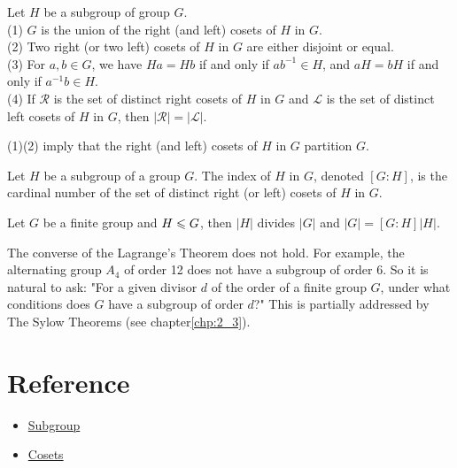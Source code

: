 \begin{corollary}{}{}
    Let $H$ be a subgroup of group $G$.\\
    (1) $G$ is the union of the right (and left) cosets of $H$ in $G$.\\
    (2) Two right (or two left) cosets of $H$ in $G$ are either disjoint or equal.\\
    (3) For $a,b\in G$, we have $Ha=Hb$ if and only if $ab^{-1}\in H$, and $aH=bH$ if and only if $a^{-1}b\in H$.\\
    (4) If $\mathcal{R}$ is the set of distinct right cosets of $H$ in $G$ and $\mathcal{L}$ is the set of distinct left cosets of $H$ in $G$,
    then $|\mathcal{R}|=|\mathcal{L}|$.
\end{corollary}
\begin{remark}
    (1)(2) imply that the right (and left) cosets of $H$ in $G$ partition $G$.
\end{remark}

\begin{definition}{}{}
    Let $H$ be a subgroup of a group $G$.
    The index of $H$ in $G$,
    denoted $[G : H]$, 
    is the cardinal number of the set of distinct right (or left) cosets
    of $H$ in $G$.
\end{definition}

\begin{theorem}{}{}
    Let $G$ be a finite group and $H\leqslant G$,
    then $|H|$ divides $|G|$ and $|G|=[G:H]|H|$.
\end{theorem}

\begin{remark}{}{}
    The converse of the Lagrange's Theorem does
    not hold. For example, the alternating group $A_4$ of order 12 
    does not have a subgroup of order $6$. So
    it is natural to ask: "For a given divisor $d$ 
    of the order of a finite group $G$, under
    what conditions does $G$ have a subgroup of order $d$?" 
    This is partially addressed by The Sylow Theorems (see chapter\ref{chp:2_3}).
\end{remark}


\section{Reference}
\begin{itemize}
    \item \href{https://faculty.etsu.edu/gardnerr/5410/notes/I-2.pdf}{Subgroup}
    \item \href{https://faculty.etsu.edu/gardnerr/5410/notes/I-4.pdf}{Cosets}
\end{itemize}